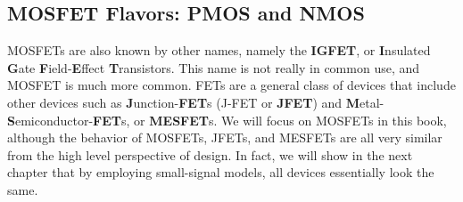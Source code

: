 \subsection{MOSFET Flavors:  PMOS and NMOS}
MOSFETs are also known by other names, namely the \textbf{IGFET}, or \textbf{I}nsulated \textbf{G}ate \textbf{F}ield-\textbf{E}ffect \textbf{T}ransistors.  This name is not really in common use, and MOSFET is much more common.  FETs are a general class of devices that include other devices such as \textbf{J}unction-\textbf{FET}s (J-FET or \textbf{JFET}) and \textbf{M}etal-\textbf{S}emiconductor-\textbf{FET}s, or \textbf{MESFET}s.  We will focus on MOSFETs in this book, although the behavior of MOSFETs, JFETs, and MESFETs are all very similar from the high level perspective of design.  In fact, we will show in the next chapter that by employing small-signal models, all devices essentially look the same.

